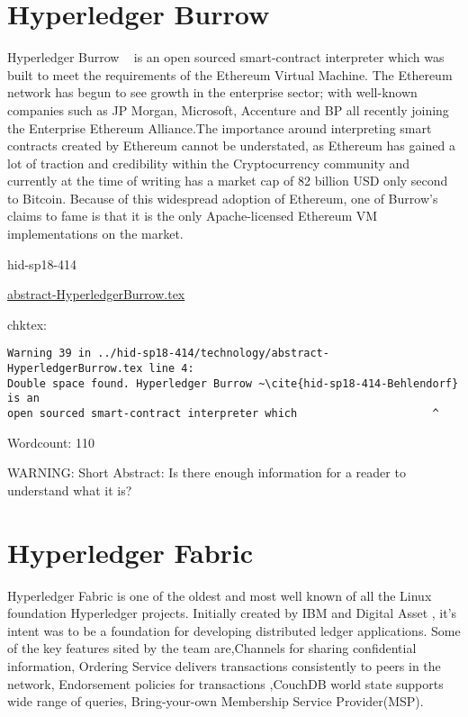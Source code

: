 \section{Hyperledger Burrow}

Hyperledger Burrow ~\cite{hid-sp18-414-Behlendorf} is an open sourced smart-contract interpreter which
was built to meet the requirements of the Ethereum Virtual
Machine. The Ethereum network has begun to see growth in the
enterprise sector; with well-known companies such as JP Morgan,
Microsoft, Accenture and BP all recently joining the Enterprise
Ethereum Alliance.The importance around interpreting
smart contracts created by Ethereum cannot be understated, as Ethereum
has gained a lot of traction and credibility within the Cryptocurrency
community and currently at the time of writing has a market cap of 82
billion USD only second to Bitcoin. Because of this widespread
adoption of Ethereum, one of Burrow’s claims to fame is that it is the
only Apache-licensed Ethereum VM implementations on the
market.~\cite{hid-sp18-414-Hyperledger_Burrow}




\begin{IU}

hid-sp18-414

\href{https://github.com/cloudmesh-community/hid-sp18-414/blob/master//technology/abstract-HyperledgerBurrow.tex}{abstract-HyperledgerBurrow.tex}

 
chktex:
\begin{tiny}
\begin{verbatim}
Warning 39 in ../hid-sp18-414/technology/abstract-HyperledgerBurrow.tex line 4:
Double space found. Hyperledger Burrow ~\cite{hid-sp18-414-Behlendorf} is an
open sourced smart-contract interpreter which                     ^
\end{verbatim}
\end{tiny}

Wordcount: 110

WARNING: Short Abstract: Is there enough information for a reader to understand what it is?

\end{IU}

\section{Hyperledger Fabric}


Hyperledger Fabric  is one of the oldest and most well known of all the
Linux foundation Hyperledger projects. Initially created by IBM and
Digital Asset , it's intent was to be a foundation for developing
distributed ledger applications. Some of the key features sited by the
team are,Channels for sharing confidential information, Ordering
Service delivers transactions consistently to peers in the network,
Endorsement policies for transactions ,CouchDB world state supports
wide range of queries, Bring-your-own Membership Service
Provider(MSP).~\cite{hid-sp18-414-Hyperledger_Fabric}

